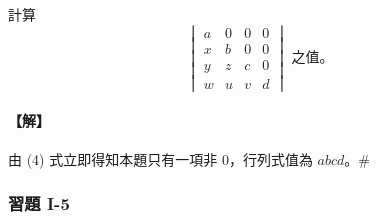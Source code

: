 \begin{example}\label{ex:b6s-1-24}
計算
\[ \begin{vmatrix}
a & 0 & 0 & 0 \\
x & b & 0 & 0 \\
y & z & c & 0 \\
w & u & v & d
\end{vmatrix} \text{ 之值。} \]
\end{example}

\paragraph{【解】}
由 (4) 式立即得知本題只有一項非 0，行列式值為 $abcd$。\hfill$\#$

\subsubsection*{習題 I-5}\label{sec:b6s-ex1-5}

